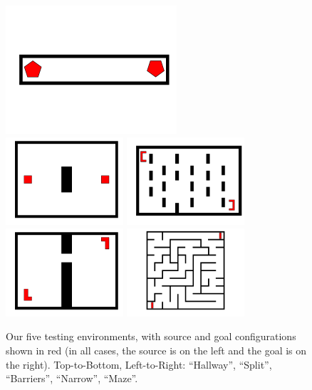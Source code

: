 \documentclass[conference]{IEEEtran}
\begin{document}
\begin{figure}[h]
	\centering
	\includegraphics[clip, trim=0cm 4cm 0cm 4cm, width=2.5in]{figures/hallway_problem.pdf}\\
	\includegraphics[width=1.72in]{figures/split_problem.pdf}
	\includegraphics[width=1.72in]{figures/barriers_problem.pdf}
	\includegraphics[width=1.72in]{figures/narrow_problem.pdf}
	\includegraphics[width=1.72in]{figures/maze_problem.pdf}
	\caption{Our five testing environments, with source and goal configurations shown in red (in all cases, the source is on the left and the goal is on the right). Top-to-Bottom, Left-to-Right: ``Hallway'', ``Split'', ``Barriers'', ``Narrow'', ``Maze''.}
	\label{fig:problem_environments}
\end{figure}
\end{document}
